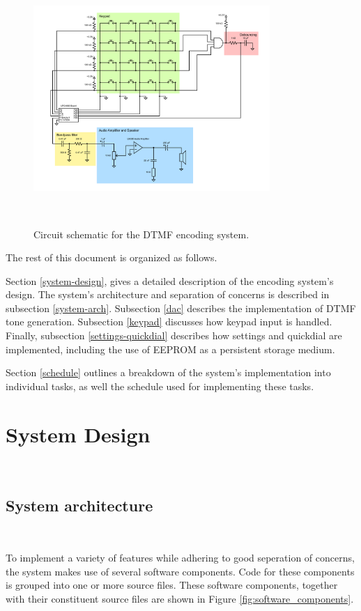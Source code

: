 \documentclass[11pt,a4paper,twocolumn]{scrartcl}
\begin{document}
   \begin{figure}
      \centering
      \includegraphics[width=0.8\textwidth]{circuit_schematic}
      \caption{Circuit schematic for the DTMF encoding system.}~\label{fig:circuit-schematic}
   \end{figure}

   The rest of this document is organized as follows.

   Section \ref{system-design}, gives a detailed description of the encoding system's design. The system's architecture and separation of concerns is described in subsection \ref{system-arch}. Subsection \ref{dac} describes the implementation of DTMF tone generation. Subsection \ref{keypad} discusses how keypad input is handled. Finally, subsection \ref{settings-quickdial} describes how settings and quickdial are implemented, including the use of EEPROM as a persistent storage medium.

   Section \ref{schedule} outlines a breakdown of the system's implementation into individual tasks, as well the schedule used for implementing these tasks.

\section{System Design}~\label{system-design}

\subsection{System architecture}~\label{system-arch}

To implement a variety of features while adhering to good seperation of concerns, the system makes use of several software components. Code for these components is grouped into one or more source files. These software components, together with their constituent source files are shown in Figure \ref{fig:software_components}.
\end{document}
